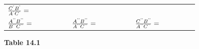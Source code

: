 {{\begin{center}
\begin{xtabular}[t]{|l|l|l|}
                \begin{math}\frac{{C}^{\text{'}}{B}^{\text{'}}}{{A}^{\text{'}}{C}^{\text{'}}}=\phantom{\rule{42.67912pt}{0ex}}\end{math}
     \tabularnewline{}
    
    
        
                \begin{math}\frac{{A}^{\text{'}\text{'}}{B}^{\text{'}\text{'}}}{{B}^{\text{'}\text{'}}{C}^{\text{'}\text{'}}}=\phantom{\rule{42.67912pt}{0ex}}\end{math}
               &
    
    
        
                \begin{math}\frac{{A}^{\text{'}\text{'}}{B}^{\text{'}\text{'}}}{{A}^{\text{'}\text{'}}{C}^{\text{'}\text{'}}}=\phantom{\rule{42.67912pt}{0ex}}\end{math}
               &
    
    
        
                \begin{math}\frac{{C}^{\text{'}\text{'}}{B}^{\text{'}\text{'}}}{{A}^{\text{'}\text{'}}{C}^{\text{'}\text{'}}}=\phantom{\rule{42.67912pt}{0ex}}\end{math}
     \tabularnewline{}
    \end{xtabular}
      \end{center}
    \begin{center}{\small\bfseries Table 14.1}\end{center}
    
}}
